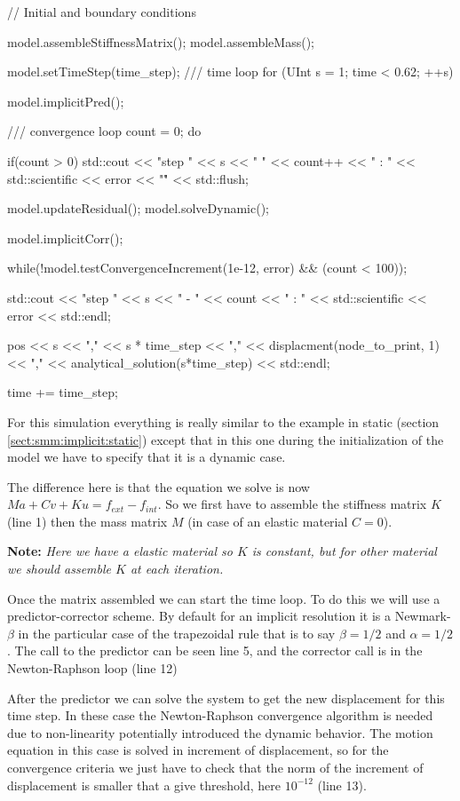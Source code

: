 \documentclass[a4paper,11pt]{book}
\newcommand{\note}[1]{\textbf{Note: }\textit{#1}}
\begin{document}
\begin{cpp}
  // Initial and boundary conditions

 model.assembleStiffnessMatrix();
 model.assembleMass();

 model.setTimeStep(time_step);
 /// time loop
 for (UInt s = 1; time < 0.62; ++s) {

   model.implicitPred();

   /// convergence loop
   count = 0;
   do {
     if(count > 0)
       std::cout << "step " << s << " " << count++ << " : "
		    << std::scientific << error << "\r" << std::flush;

     model.updateResidual();
     model.solveDynamic();

     model.implicitCorr();
    } while(!model.testConvergenceIncrement(1e-12, error) &&
	       (count < 100));

    std::cout << "step " << s << " - " << count << " : "
		 << std::scientific << error << std::endl;

    pos << s << "," << s * time_step
	   << "," << displacment(node_to_print, 1)
	   << "," << analytical_solution(s*time_step) << std::endl;

    time += time_step;
 }
\end{cpp}

For  this simulation  everything  is really  similar  to the  example in  static
(section  \ref{sect:smm:implicit:static}) except  that  in this  one during  the
initialization of the model we have to specify that it is a dynamic case.

The difference here is that the equation we solve is now $Ma + Cv + Ku = f_{ext}
- f_{int}$. So we first have to  assemble the stiffness matrix $K$ (line 1) then
the mass matrix $M$ (in case of an elastic material $C = 0$).

\note{Here we have a elastic material so $K$ is constant, but for other material
  we should assemble $K$ at each iteration.}

Once the matrix assembled  we can start the time loop. To do  this we will use a
predictor-corrector  scheme. By  default  for  an implicit  resolution  it is  a
Newmark-$\beta$ in  the particular case of  the trapezoidal rule that  is to say
$\beta = 1/2$ and $\alpha = 1/2$.  The call to the predictor can be seen line 5,
and the corrector call is in the Newton-Raphson loop (line 12)

After the predictor we can solve the system to get the new displacement for this
time step. In these case  the Newton-Raphson convergence algorithm is needed due
to  non-linearity  potentially  introduced  the  dynamic  behavior.  The  motion
equation  in this  case  is solved  in  increment of  displacement,  so for  the
convergence criteria  we just have  to check that  the norm of the  increment of
displacement is smaller that a give threshold, here $10^{-12}$ (line 13).
\end{document}
